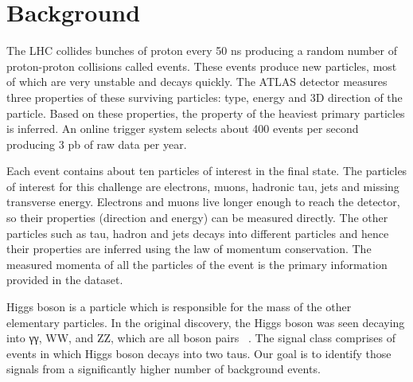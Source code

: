\section{Background}
\label{sec:background}

The LHC collides bunches of proton every 50 ns producing a random number of proton-proton collisions called events. These events produce new particles, most of which are very unstable and decays quickly. The ATLAS detector measures three properties of these surviving particles: type, energy and 3D direction of the particle. Based on these properties,  the property of the heaviest primary particles is inferred. An online trigger system selects about 400 events per second producing 3 pb of raw data per year.

Each event contains about ten particles of interest in the final state. The particles of interest for this challenge are electrons, muons, hadronic tau, jets and missing transverse energy. Electrons and muons live longer enough to reach the detector, so their properties (direction and energy) can be measured directly. The other particles such as tau, hadron and jets decays into different particles and hence their properties are inferred using the law of momentum conservation.  The measured momenta of all the particles of the event is the primary information provided in the dataset. 

Higgs boson is a particle which is responsible for the mass of the other elementary particles. In the original discovery, the Higgs boson was seen decaying into γγ, WW, and ZZ, which are all boson pairs~\cite{Ananya1,Ananya2} . The signal class comprises of events in which Higgs boson decays into two taus. Our goal is to identify those signals from a significantly higher number of background events.
